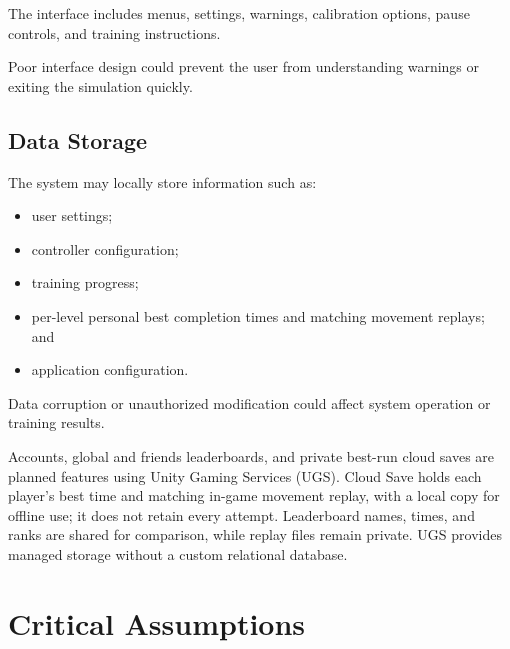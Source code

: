 \documentclass{article}
\begin{document}
The interface includes menus, settings, warnings, calibration options, pause
controls, and training instructions.

Poor interface design could prevent the user from understanding warnings or
exiting the simulation quickly.

\subsection{Data Storage}

The system may locally store information such as:

\begin{itemize}
    \item user settings;
    \item controller configuration;
    \item training progress;
    \item per-level personal best completion times and matching movement replays; and
    \item application configuration.
\end{itemize}

Data corruption or unauthorized modification could affect system operation or
training results.

Accounts, global and friends leaderboards, and private best-run cloud saves are
planned features using Unity Gaming Services (UGS). Cloud Save holds each
player's best time and matching in-game movement replay, with a local copy for
offline use; it does not retain every attempt. Leaderboard names, times, and
ranks are shared for comparison, while replay files remain private. UGS provides
managed storage without a custom relational database.

\section{Critical Assumptions}\label{sec:assumptions}
\end{document}
